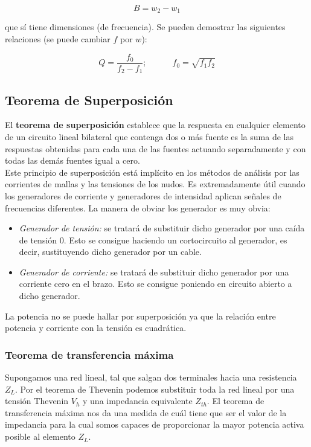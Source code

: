 \documentclass[12pt]{article}
\newcommand{\tquad}{\quad \quad \quad}
\begin{document}
\begin{equation}
B = w_2 - w_1
\end{equation}

que sí tiene dimensiones (de frecuencia). Se pueden demostrar las siguientes relaciones (se puede cambiar $f$ por $w$):

\begin{equation}
Q = \dfrac{f_0}{f_2  - f_1}; \tquad f_0 = \sqrt{f_1 f_2}
\end{equation} 


\subsection{Teorema de Superposición}

El \textbf{teorema de superposición} establece que la respuesta en cualquier elemento de un circuito lineal bilateral que contenga dos o más fuente es la suma de las respuestas obtenidas para cada una de las fuentes actuando separadamente y con todas las demás fuentes igual a cero. \\

Este principio de superposición está implícito en los métodos de análisis por las corrientes de mallas y las tensiones de los nudos. Es extremadamente útil cuando los generadores de corriente y generadores de intensidad aplican señales de frecuencias diferentes. La manera de obviar los generador es muy obvia:

\begin{itemize}
\item \textit{Generador de tensión:} se tratará de substituir dicho generador por una caída de tensión 0. Esto se consigue haciendo un cortocircuito al generador, es decir, sustituyendo dicho generador por un cable.
\item \textit{Generador de corriente:} se tratará de substituir dicho generador por una corriente cero en el brazo. Esto se consigue poniendo en circuito abierto a dicho generador.
\end{itemize}

La potencia no se puede hallar por superposición ya que la relación entre potencia y corriente con la tensión es cuadrática.

\subsubsection{Teorema de transferencia máxima}

Supongamos una red lineal, tal que salgan dos terminales hacia una resistencia $Z_L$. Por el teorema de Thevenin podemos substituir toda la red lineal por una tensión Thevenin $V_h$ y una impedancia equivalente $Z_{th}$. El teorema de transferencia máxima nos da una medida de cuál tiene que ser el valor de la impedancia para la cual somos capaces de proporcionar la mayor potencia activa posible al elemento $Z_L$.  \\
\end{document}
